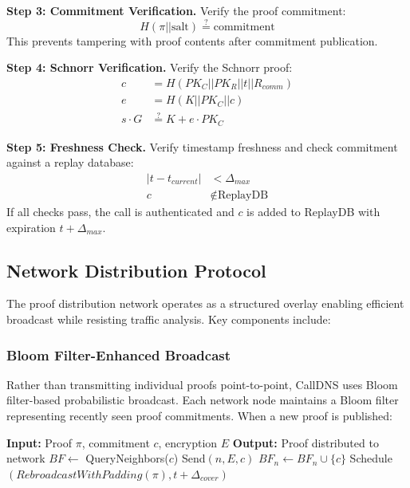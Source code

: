 \documentclass[11pt,twocolumn]{article}
\begin{document}
\textbf{Step 3: Commitment Verification.} Verify the proof commitment:
\begin{equation}
H(\pi || \text{salt}) \stackrel{?}{=} \text{commitment}
\end{equation}
This prevents tampering with proof contents after commitment publication.

\textbf{Step 4: Schnorr Verification.} Verify the Schnorr proof:
\begin{align}
c &= H(PK_C || PK_R || t || R_{comm}) \\
e &= H(K || PK_C || c) \\
s \cdot G &\stackrel{?}{=} K + e \cdot PK_C
\end{align}

\textbf{Step 5: Freshness Check.} Verify timestamp freshness and check commitment against a replay database:
\begin{align}
|t - t_{current}| &< \Delta_{max} \\
c &\notin \text{ReplayDB}
\end{align}
If all checks pass, the call is authenticated and $c$ is added to ReplayDB with expiration $t + \Delta_{max}$.

\subsection{Network Distribution Protocol}

The proof distribution network operates as a structured overlay enabling efficient broadcast while resisting traffic analysis. Key components include:

\subsubsection{Bloom Filter-Enhanced Broadcast}

Rather than transmitting individual proofs point-to-point, CallDNS uses Bloom filter-based probabilistic broadcast. Each network node maintains a Bloom filter representing recently seen proof commitments. When a new proof is published:

\begin{algorithm}
\caption{Proof Broadcast Protocol}
\begin{algorithmic}
\STATE \textbf{Input:} Proof $\pi$, commitment $c$, encryption $E$
\STATE \textbf{Output:} Proof distributed to network
\STATE
\STATE $BF \leftarrow$ QueryNeighbors($c$)
        \STATE Send$(n, E, c)$
        \STATE $BF_n \leftarrow BF_n \cup \{c\}$
    \ENDIF
\ENDFOR
\STATE Schedule$(RebroadcastWithPadding(\pi), t + \Delta_{cover})$
\end{algorithmic}
\end{algorithm}
\end{document}
